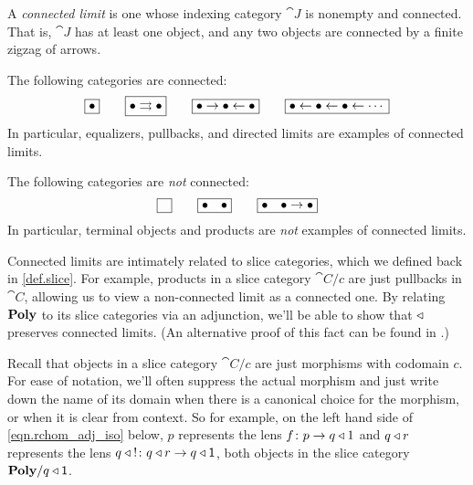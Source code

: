 \documentclass[Book-Poly]{subfiles}
\begin{document}
\begin{definition}
A \emph{connected limit} is one whose indexing category $\cat{J}$ is nonempty and connected. That is, $\cat{J}$ has at least one object, and any two objects are connected by a finite zigzag of arrows.
\end{definition}

\begin{example}
The following categories are connected:
\[
\fbox{$\bullet$}
\qquad
\fbox{$\bullet\rightrightarrows\bullet$}
\qquad
\fbox{$\bullet\to\bullet\leftarrow\bullet$}
\qquad
\fbox{$\bullet\leftarrow\bullet\leftarrow\bullet\leftarrow\cdots$}
\]
In particular, equalizers, pullbacks, and directed limits are examples of connected limits. 

The following categories are \emph{not} connected:
\[
\fbox{$\phantom{\bullet}$}
\qquad
\fbox{$\bullet\quad\bullet$}
\qquad
\fbox{$\bullet\quad\bullet\to \bullet$}
\]
In particular, terminal objects and products are \emph{not} examples of connected limits.
\end{example}

Connected limits are intimately related to slice categories, which we defined back in \cref{def.slice}.
For example, products in a slice category $\cat{C}/c$ are just pullbacks in $\cat{C}$, allowing us to view a non-connected limit as a connected one.
By relating $\mathbf{Poly}$ to its slice categories via an adjunction, we'll be able to show that $\mathbin{\triangleleft}$ preserves connected limits.
(An alternative proof of this fact can be found in \cite[Proposition 1.16]{kock2012polynomial}.)

Recall that objects in a slice category $\cat{C}/c$ are just morphisms with codomain $c$.
For ease of notation, we'll often suppress the actual morphism and just write down the name of its domain when there is a canonical choice for the morphism, or when it is clear from context.
So for example, on the left hand side of \eqref{eqn.rchom_adj_iso} below, $p$ represents the lens $f\colon p\to q\mathbin{\triangleleft} 1$ and $q\mathbin{\triangleleft} r$ represents the lens $q\:\mathbin{\triangleleft}\:!\colon q\mathbin{\triangleleft} r\to q\mathbin{\triangleleft}\textsf{1}$, both objects in the slice category $\mathbf{Poly}/q\mathbin{\triangleleft}\textsf{1}$.
\end{document}
